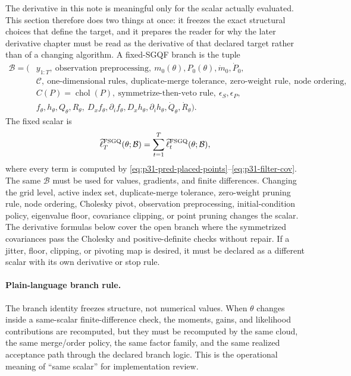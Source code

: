 \documentclass[11pt]{article}
\numberwithin{equation}{section}
\newcommand{\chol}{\operatorname{chol}}
\newcommand{\ellhat}{\widehat\ell}
\begin{document}
The derivative in this note is meaningful only for the scalar actually
evaluated.  This section therefore does two things at once: it freezes the exact
structural choices that define the target, and it prepares the reader for why
the later derivative chapter must be read as the derivative of that declared
target rather than of a changing algorithm.  A fixed-SGQF branch is the tuple
\begin{equation}
\begin{aligned}
  \mathcal B
  =
  (&y_{1:T},\ \text{observation preprocessing},\
  m_0(\theta),P_0(\theta),\dot m_0,\dot P_0,\\
  &\mathcal C,\ \text{one-dimensional rules},\
  \text{duplicate-merge tolerance},\
  \text{zero-weight rule},\
  \text{node ordering},\\
  &C(P)=\chol(P),\
  \text{symmetrize-then-veto rule},\
  \epsilon_S,\epsilon_P,\\
  &f_\theta,h_\theta,Q_\theta,R_\theta,\
  D_xf_\theta,\partial_i f_\theta,
  D_xh_\theta,\partial_i h_\theta,\dot Q_\theta,\dot R_\theta).
\end{aligned}
  \label{eq:p31-branch-tuple}
\end{equation}
The fixed scalar is
\begin{equation}
  \ellhat_T^{\rm FSGQ}(\theta;\mathcal B)
  =
  \sum_{t=1}^T \ellhat_t^{\rm FSGQ}(\theta;\mathcal B),
  \label{eq:p31-fixed-scalar}
\end{equation}
where every term is computed by
\eqref{eq:p31-pred-placed-points}--\eqref{eq:p31-filter-cov}.  The same
\(\mathcal B\) must be used for values, gradients, and finite differences.
Changing the grid level, active index set, duplicate-merge tolerance,
zero-weight pruning rule, node ordering, Cholesky pivot, observation
preprocessing, initial-condition policy, eigenvalue floor, covariance clipping,
or point pruning changes the scalar.  The
derivative formulas below cover the open branch where the symmetrized
covariances pass the Cholesky and positive-definite checks without repair.  If
a jitter, floor, clipping, or pivoting map is desired, it must be declared as a
different scalar with its own derivative or stop rule.

\paragraph{Plain-language branch rule.}
The branch identity freezes structure, not numerical values.  When
\(\theta\) changes inside a same-scalar finite-difference check, the moments,
gains, and likelihood contributions are recomputed, but they must be recomputed
by the same cloud, the same merge/order policy, the same factor family, and the
same realized acceptance path through the declared branch logic.  This is the
operational meaning of ``same scalar'' for implementation review.
\end{document}
